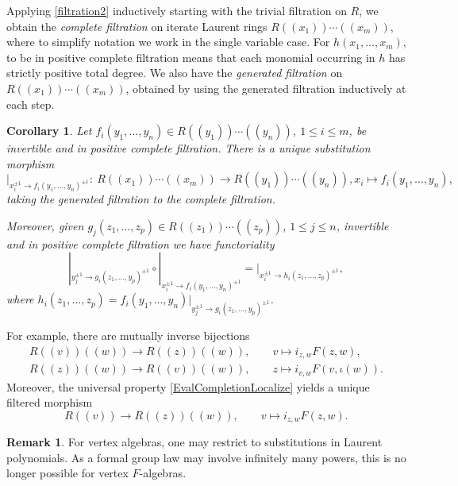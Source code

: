 \documentclass[pdftex]{sigma}
\numberwithin{equation}{section}
\newtheorem{Corollary}[Theorem]{Corollary}
\theoremstyle{definition}
\newtheorem{Remark}[Theorem]{Remark}
\begin{document}
Applying \eqref{filtration2} inductively starting with the trivial filtration on $R$, we obtain the \emph{complete filtration} on iterate Laurent rings $R(\!( x_1)\!)\cdots(\!( x_m)\!)$, where to simplify notation we work in the single variable case. For $h(x_1,\dots, x_m)$, to be in positive complete filtration means that each monomial occurring in $h$ has strictly positive total degree. We also have the \emph{generated filtration} on $R(\!( x_1)\!)\cdots(\!( x_m)\!)$, obtained by using the generated filtration inductively at each step.

\begin{Corollary}
Let $f_i(y_1,\dots,y_n)\in R(\!( y_1)\!)\cdots(\!( y_n)\!)$, $1\leqslant i\leqslant m$, be invertible and in positive complete filtration. There is a unique \emph{substitution morphism}{\samepage
\[
 |_{x_i^{\pm1}\to f_i(y_1,\dots,y_n)^{\pm1}}\colon\ R(\!( x_1)\!)\cdots(\!( x_m)\!)\longrightarrow R(\!( y_1)\!)\cdots(\!( y_n)\!), x_i\longmapsto f_i(y_1,\dots,y_n),
\]
taking the generated filtration to the complete filtration.}

Moreover, given $g_j(z_1,\dots, z_p)\in R(\!( z_1)\!)\cdots(\!( z_p)\!)$, $1\leqslant j\leqslant n$, invertible and in positive complete filtration we have \emph{functoriality}
\[
 |_{y_j^{\pm1}\to g_i(z_1,\dots,y_p)^{\pm1}} \circ |_{x_i^{\pm1}\to f_i(y_1,\dots,y_n)^{\pm1}}=|_{x_i^{\pm1}\to h_i(z_1,\dots, z_p)^{\pm1}},
\]
where $h_i(z_1,\dots, z_p)=f_i(y_1,\dots,y_n)|_{y_j^{\pm1}\to g_i(z_1,\dots,y_p)^{\pm1}}$.
\end{Corollary}

For example, there are mutually inverse bijections
\begin{gather}
 R(\!( v)\!)(\!( w)\!)\longrightarrow R(\!( z)\!)(\!( w)\!),\qquad v\longmapsto i_{z,w}F(z,w), \label{substitution1}\\
 R(\!( z)\!)(\!( w)\!)\longrightarrow R(\!( v)\!)(\!( w)\!),\qquad z\longmapsto i_{v,w}F(v,\iota(w)).\label{substitution3}
\end{gather}
Moreover, the universal property \eqref{EvalCompletionLocalize} yields a unique filtered morphism
 \begin{equation}
 \label{substitution2}
 R(\!( v)\!)\longrightarrow R(\!( z)\!)(\!( w)\!),\qquad v\longmapsto i_{z,w}F(z,w).
 \end{equation}


\begin{Remark}
 For vertex algebras, one may restrict to substitutions in Laurent polynomials. As a formal group law may involve infinitely many powers, this is no longer possible for vertex $F$-algebras.
\end{Remark}
\end{document}
